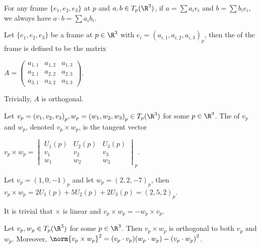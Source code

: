 \documentclass[10pt]{article}
\begin{document}
\par
For any frame $\{{e}_{1},{e}_{2},{e}_{3}\}$ at $p$ and $a,b\in{T}_{p}({\R}^{3})$, if $a=\sum{a}_{i}{e}_{i}$ and $b=\sum{b}_{i}{e}_{i}$, we always have $a\cdot b=\sum{a}_{i}{b}_{i}$.
\begin{definition}
    Let $\{{e}_{1},{e}_{2},{e}_{3}\}$ be a frame at $p\in{\R}^{3}$ with ${e}_{i}={({a}_{i,1},{a}_{i,2},{a}_{i,3})}_{p}$, then the  of the frame is defined to be the matrix
    \begin{center}
        $A=\begin{pmatrix}
            {a}_{1,1} & {a}_{1,2} & {a}_{1,3} \\
            {a}_{2,1} & {a}_{2,2} & {a}_{2,3} \\
            {a}_{3,1} & {a}_{3,2} & {a}_{3,3}
        \end{pmatrix}$.
    \end{center}
\end{definition}
\par
Trivially, $A$ is orthogonal.
\begin{definition}
    Let ${v}_{p}={({v}_{1},{v}_{2},{v}_{3})}_{p},{w}_{p}={({w}_{1},{w}_{2},{w}_{3})}_{p}\in{T}_{p}({\R}^{3})$ for some $p\in{\R}^{3}$. The  of ${v}_{p}$ and ${w}_{p}$, denoted ${v}_{p}\times{w}_{p}$, is the tangent vector
    \begin{center}
        ${v}_{p}\times{w}_{p}={\begin{vmatrix}
            {U}_{1}(p) & {U}_{2}(p) & {U}_{3}(p) \\
            {v}_{1} & {v}_{2} & {v}_{3} \\
            {w}_{1} & {w}_{2} & {w}_{3} 
        \end{vmatrix}}_{p}$.
    \end{center}
\end{definition}
\begin{example}
    Let ${v}_{p}={(1,0,-1)}_{p}$ and let ${w}_{p}={(2,2,-7)}_{p}$, then ${v}_{p}\times{w}_{p}=2{U}_{1}(p)+5{U}_{2}(p)+2{U}_{3}(p)={(2,5,2)}_{p}$.
\end{example}
\par
It is trivial that $\times$ is linear and ${v}_{p}\times{w}_{p}=-{w}_{p}\times{v}_{p}$.
\begin{proposition}
    Let ${v}_{p},{w}_{p}\in{T}_{p}({\R}^{3})$ for some $p\in{\R}^{3}$. Then ${v}_{p}\times{w}_{p}$ is orthogonal to both ${v}_{p}$ and ${w}_{p}$. Moreover, ${\norm{{v}_{p}\times{w}_{p}}}^{2}=({v}_{p}\cdot{v}_{p})({w}_{p}\cdot{w}_{p})-{({v}_{p}\cdot{w}_{p})}^{2}$.
\end{proposition}
\end{document}
